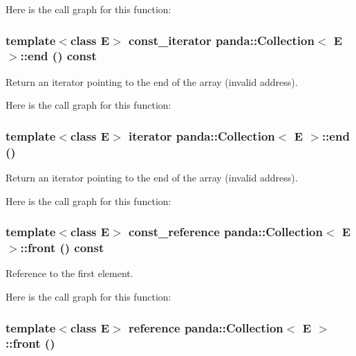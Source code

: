 Here is the call graph for this function:\hypertarget{classpanda_1_1Collection_a476ee3bc2ac965600622a57e39ea1c58}{
\subsubsection[{end}]{\setlength{\rightskip}{0pt plus 5cm}template$<$class E$>$ {\bf const\_\-iterator} {\bf panda::Collection}$<$ E $>$::end () const}}
\label{classpanda_1_1Collection_a476ee3bc2ac965600622a57e39ea1c58}


Return an iterator pointing to the end of the array (invalid address). 

Here is the call graph for this function:\hypertarget{classpanda_1_1Collection_ab0c911f9b8ea2734f2f255ab2b65cd8f}{
\subsubsection[{end}]{\setlength{\rightskip}{0pt plus 5cm}template$<$class E$>$ {\bf iterator} {\bf panda::Collection}$<$ E $>$::end ()}}
\label{classpanda_1_1Collection_ab0c911f9b8ea2734f2f255ab2b65cd8f}


Return an iterator pointing to the end of the array (invalid address). 

Here is the call graph for this function:\hypertarget{classpanda_1_1Collection_a39ebd4f13c72ae9f8e7133b7f9f4a3a5}{
\subsubsection[{front}]{\setlength{\rightskip}{0pt plus 5cm}template$<$class E$>$ {\bf const\_\-reference} {\bf panda::Collection}$<$ E $>$::front () const}}
\label{classpanda_1_1Collection_a39ebd4f13c72ae9f8e7133b7f9f4a3a5}


Reference to the first element. 

Here is the call graph for this function:\hypertarget{classpanda_1_1Collection_a13746b6da09a9db21c7adbc9125862b5}{
\subsubsection[{front}]{\setlength{\rightskip}{0pt plus 5cm}template$<$class E$>$ {\bf reference} {\bf panda::Collection}$<$ E $>$::front ()}}
\label{classpanda_1_1Collection_a13746b6da09a9db21c7adbc9125862b5}


